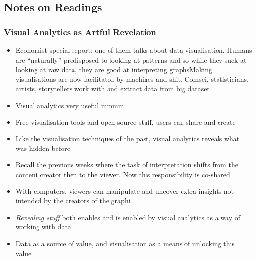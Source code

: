 \documentclass[a4paper]{article}
\begin{document}
\subsection{Notes on Readings}
\subsubsection{Visual Analytics as Artful Revelation}
\begin{itemize}
	\item Economist special report: one of them talks about data visualisation. Humans are ``naturally'' predisposed to looking at patterns and so while they suck at looking at raw data, they are good at interpreting graphsMaking visualisations are now facilitated by machines and shit. Comsci, statisticians, artists, storytellers work with and extract data from big dataset
	\item Visual analytics very useful mmmm
	\item Free visualisation tools and open source stuff, users can share and create
	\item Like the visualisation techniques of the past, visual analytics reveals what was hidden before
	\item Recall the previous weeks where the task of interpretation shifts from the content creator then to the viewer. Now this responsibility is co-shared
	\item With computers, viewers can manipulate and uncover extra insights not intended by the creators of the graphi
	\item \textit{Revealing stuff} both enables and is enabled by visual analytics as a way of working with data 
	\item Data as a source of value, and visualisation as a means of unlocking this value
\end{itemize}
\end{document}
